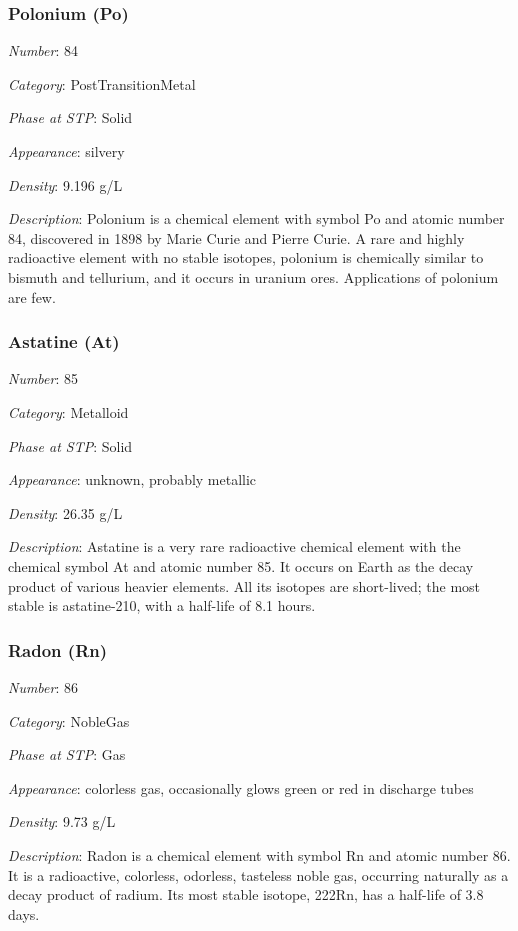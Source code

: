 \documentclass{article}
\begin{document}
\hypertarget{subsubsection::Po}{}\subsubsection{Polonium (Po)}

\textit{Number}: 84

\textit{Category}: PostTransitionMetal

\textit{Phase at STP}: Solid

\textit{Appearance}: silvery

\textit{Density}: 9.196 g/L

\textit{Description}: Polonium is a chemical element with symbol Po and atomic number 84, discovered in 1898 by Marie Curie and Pierre Curie. A rare and highly radioactive element with no stable isotopes, polonium is chemically similar to bismuth and tellurium, and it occurs in uranium ores. Applications of polonium are few.

\hypertarget{subsubsection::At}{}\subsubsection{Astatine (At)}

\textit{Number}: 85

\textit{Category}: Metalloid

\textit{Phase at STP}: Solid

\textit{Appearance}: unknown, probably metallic

\textit{Density}: 26.35 g/L

\textit{Description}: Astatine is a very rare radioactive chemical element with the chemical symbol At and atomic number 85. It occurs on Earth as the decay product of various heavier elements. All its isotopes are short-lived; the most stable is astatine-210, with a half-life of 8.1 hours.

\hypertarget{subsubsection::Rn}{}\subsubsection{Radon (Rn)}

\textit{Number}: 86

\textit{Category}: NobleGas

\textit{Phase at STP}: Gas

\textit{Appearance}: colorless gas, occasionally glows green or red in discharge tubes

\textit{Density}: 9.73 g/L

\textit{Description}: Radon is a chemical element with symbol Rn and atomic number 86. It is a radioactive, colorless, odorless, tasteless noble gas, occurring naturally as a decay product of radium. Its most stable isotope, 222Rn, has a half-life of 3.8 days.
\end{document}
